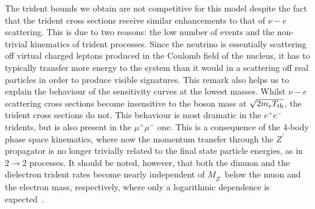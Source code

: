 The trident bounds we obtain are not competitive for this model despite the fact that the trident cross sections receive similar enhancements to that of $\nu-e$ scattering. This is due to two reasons: the low number of events and the non-trivial kinematics of trident processes. Since the neutrino is essentially scattering off virtual charged leptons produced in the Coulomb field of the nucleus, it has to typically transfer more energy to the system than it would in a scattering off real particles in order to produce visible signatures. This remark also helps us to explain the behaviour of the sensitivity curves at the lowest masses. Whilst $\nu-e$ scattering cross sections become insensitive to the boson mass at $\sqrt{2 m_e T_{\rm th}}$, the trident cross sections do not. This behaviour is most dramatic in the $e^+e^-$ tridents, but is also present in the $\mu^+\mu^-$ one. This is a consequence of the 4-body phase space kinematics, where now the momentum transfer through the $Z^\prime$ propagator is no longer trivially related to the final state particle energies, as in $2\to2$ processes. It should be noted, however, that both the dimuon and the dielectron trident rates become nearly independent of $M_{Z^\prime}$ below the muon and the electron mass, respectively, where only a logarithmic dependence is expected~\cite{Altmannshofer2014}.

